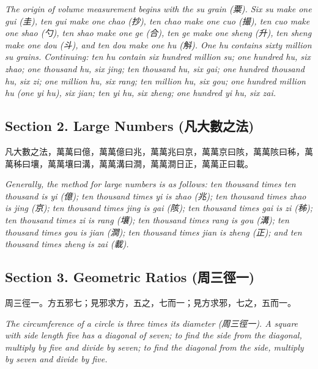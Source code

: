 \documentclass[11pt,a4paper]{article}
\newcommand{\zh}[1]{{\CJKfamily{}#1}}
\begin{document}
\textit{The origin of volume measurement begins with the su grain (\zh{粟}). Six su make one gui (\zh{圭}), ten gui make one chao (\zh{抄}), ten chao make one cuo (\zh{撮}), ten cuo make one shao (\zh{勺}), ten shao make one ge (\zh{合}), ten ge make one sheng (\zh{升}), ten sheng make one dou (\zh{斗}), and ten dou make one hu (\zh{斛}). One hu contains sixty million su grains. Continuing: ten hu contain six hundred million su; one hundred hu, six zhao; one thousand hu, six jing; ten thousand hu, six gai; one hundred thousand hu, six zi; one million hu, six rang; ten million hu, six gou; one hundred million hu (one yi hu), six jian; ten yi hu, six zheng; one hundred yi hu, six zai.}

\subsection*{Section 2. Large Numbers (\zh{凡大數之法})}

\begin{problembox}[title=\zh{凡大數之法}]
\zh{凡大數之法，萬萬曰億，萬萬億曰兆，萬萬兆曰京，萬萬京曰陔，萬萬陔曰秭，萬萬秭曰壤，萬萬壤曰溝，萬萬溝曰澗，萬萬澗日正，萬萬正曰載。}
\end{problembox}

\textit{Generally, the method for large numbers is as follows: ten thousand times ten thousand is yi (\zh{億}); ten thousand times yi is zhao (\zh{兆}); ten thousand times zhao is jing (\zh{京}); ten thousand times jing is gai (\zh{陔}); ten thousand times gai is zi (\zh{秭}); ten thousand times zi is rang (\zh{壤}); ten thousand times rang is gou (\zh{溝}); ten thousand times gou is jian (\zh{澗}); ten thousand times jian is zheng (\zh{正}); and ten thousand times zheng is zai (\zh{載}).}

\subsection*{Section 3. Geometric Ratios (\zh{周三徑一})}

\begin{problembox}[title=\zh{周三徑一}]
\zh{周三徑一。方五邪七；見邪求方，五之，七而一；見方求邪，七之，五而一。}
\end{problembox}

\textit{The circumference of a circle is three times its diameter (\zh{周三徑一}). A square with side length five has a diagonal of seven; to find the side from the diagonal, multiply by five and divide by seven; to find the diagonal from the side, multiply by seven and divide by five.}
\end{document}

